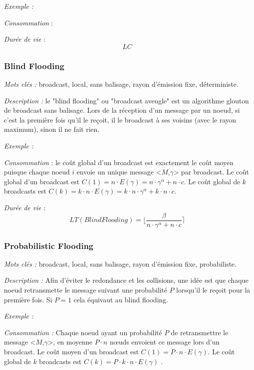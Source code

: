 \emph{Exemple :} %

\emph{Consommation} : 

\emph{Durée de vie} : $$ LC $$



\subsubsection{Blind Flooding\label{blind_flooding}}
\emph{Mots clés :} broadcast, local, sans balisage, rayon d'émission fixe, déterministe.

\emph{Description :} le "blind flooding" ou "broadcast aveugle" est un algorithme glouton de broadcast sans balisage. Lors de la réception d'un message par un noeud, si c'est la première fois qu'il le reçoit, il le broadcast à ses voisins (avec le rayon maximum), sinon il ne fait rien.

\emph{Exemple :} 

\emph{Consommation} :  le coût global d'un broadcast est exactement le coût moyen puisque chaque noeud $i$ envoie un unique message <$M$,$\gamma$> par broadcast.
Le coût global d'un broadcast est $C(1) = n \cdot E( \gamma )= n\cdot \gamma^\alpha +  n\cdot c $.
Le coût global de $k$ broadcasts est $C(k) = k\cdot n \cdot E( \gamma )= k\cdot n \cdot \gamma^\alpha +  k \cdot n\cdot c $.

\emph{Durée de vie} :   $$LT(Blind Flooding)=\lfloor \frac{\beta}{n\cdot \gamma^\alpha +  n\cdot c} \rceil$$



\subsubsection{Probabilistic Flooding\label{proba_flooding}}
\emph{Mots clés :} broadcast, local, sans balisage, rayon d'émission fixe, probabiliste.

\emph{Description :} Afin d'éviter le redondance et les collisions, une idée est que chaque noeud retransmette le message suivant une probabilité $P$ lorsqu'il le reçoit pour la première fois. Si $P=1$ cela équivaut au blind flooding.


\emph{Exemple :} 

\emph{Consommation :} Chaque noeud ayant un probabilité $P$ de retransmettre le message <$M$,$\gamma$>, en moyenne $P\cdot n$ nœuds envoient ce message lors d'un broadcast.
Le coût moyen d'un broadcast est $C(1) = P\cdot n \cdot E( \gamma ) $. Le coût global de $k$ broadcasts est $C(k) = P\cdot k\cdot n \cdot E( \gamma ) $ .

